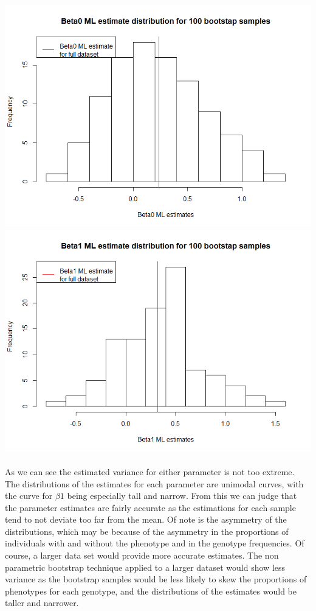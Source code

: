 \documentclass{article}
\begin{document}
	\includegraphics[scale=0.53]{Beta0}\\
	\includegraphics[scale=0.53]{Beta1}\\
	
	\paragraph{} As we can see the estimated variance for either parameter is not too extreme. The distributions of the estimates for each parameter are unimodal curves, with the curve for $\beta1$ being especially tall and narrow. From this we can judge that the parameter estimates are fairly accurate as the estimations for each sample tend to not deviate too far from the mean. Of note is the asymmetry of the distributions, which may be because of the asymmetry in the proportions of individuals with and without the phenotype and in the genotype frequencies. Of course, a larger data set would provide more accurate estimates. The non parametric bootstrap technique applied to a larger dataset would show less variance as the bootstrap samples would be less likely to skew the proportions of phenotypes for each genotype, and the distributions of the estimates would be taller and narrower.
	
\end{document}
